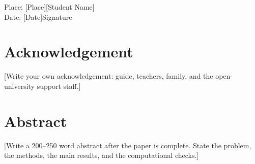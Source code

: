 \documentclass[12pt,a4paper]{report}
\theoremstyle{plain}
\theoremstyle{definition}
\theoremstyle{remark}
\begin{document}
\vspace{1.5cm}
\noindent Place: [Place]\hfill [Student Name]\\
Date: [Date]\hfill Signature

\chapter*{Acknowledgement}
[Write your own acknowledgement: guide, teachers, family, and the open-university support staff.]

\chapter*{Abstract}
[Write a 200--250 word abstract after the paper is complete. State the problem, the methods, the main results, and the computational checks.]

\tableofcontents
\listoftables















\appendix


\printbibliography[heading=bibintoc,title={References}]
\end{document}
